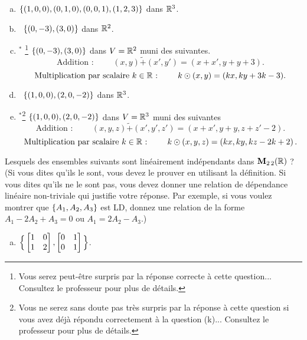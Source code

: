 \begin{prob}
\begin{enumerate}[a)]
\medskip 
 
\item $\{(1,0,0), (0,1,0), (0,0,1), (1,2,3)\}$ dans $\mathbb{R}^3$.
\medskip
 
\item\sov~$\{(0,-3), (3, 0)\}$ dans $\mathbb{R}^2$.


\medskip
 

\item$^\ast$ \footnote{Vous serez peut-être surpris par la réponse correcte à cette question... Consultez le professeur pour plus de détails.}  $\{(0,-3), (3, 0)\}$ dans $V=\mathbb{R}^2$ muni des   suivantes.
 $$\text{Addition : }\qquad(x,y) \tilde+ (x',y')=(x+x', y+y +3).$$ 
$$\text{Multiplication par scalaire $k\in \mathbb{R}$ : }\qquad k \odot (x,y)=(kx, ky+3k-3).$$    
 
\item\sov~$\{(1,0,0), (2,0,-2)\}$ dans $\mathbb{R}^3$. 

\medskip
 
\item$^\ast$\footnote{Vous ne serez sans doute pas très surpris par la réponse à cette question si vous avez déjà répondu correctement à la question (k)... Consultez le professeur pour plus de détails.}  $\{(1,0,0), (2,0,-2)\}$ dans $V=\mathbb{R}^3$ muni des  suivantes
 $$\text{Addition : }\qquad (x,y,z) \tilde+ (x',y',z')=(x+x', y+y,z+z'-2).$$ 
$$\text{Multiplication par scalaire $k\in \mathbb{R}$ : }\qquad k\odot (x,y,z)=(kx, ky, kz-2k+2)\,.$$\medskip 

\end{enumerate}

\end{prob} \begin{prob} \label{prob07.2} Lesquels des ensembles suivants sont linéairement indépendants dans $\mathbf{M}_{2 \,2}(\mathbb{R})$ ? (Si vous dites qu'ils le sont, vous devez le prouver en utilisant la définition. Si vous dites qu'ils ne le sont pas, vous devez donner une relation de dépendance linéaire non-triviale qui justifie votre réponse. Par exemple, si vous voulez montrer que $\{A_1, A_2, A_3\}$ est LD, donnez une relation de la forme  $A_1-2 A_2 +A_3=0$ ou $A_1=2 A_2 -A_3$.)
\medskip
\begin{enumerate}[a)]

\item  $\Big\{\bmatrix 1&0\\1&2\endbmatrix, \bmatrix 0&1\\0&1\endbmatrix \Big\}$.   \medskip
 


\end{enumerate}
\end{prob}
